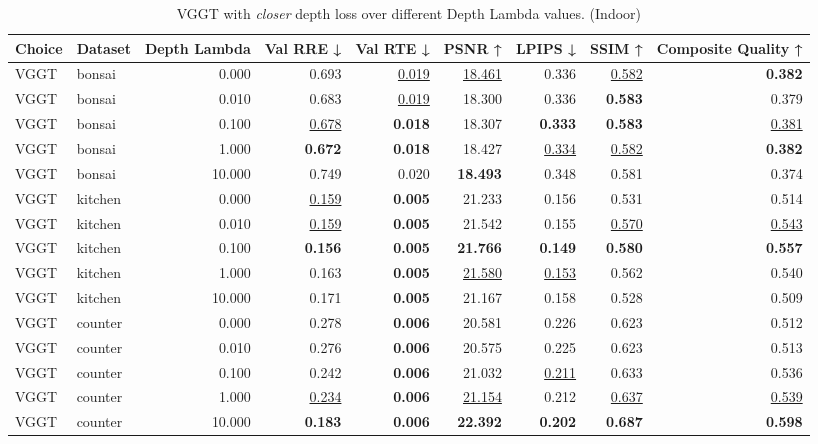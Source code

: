 \begin{table}[H]
\caption{\ifdefined\customcaption \customcaption \else VGGT with \textit{closer} depth loss over different Depth Lambda values. (Indoor) \fi}
\label{tab:05_depth_lambda_indoor}
\centering
\scriptsize
\begin{tabular}{llrrrrrrr}
\toprule
Choice & Dataset & Depth Lambda & Val RRE ↓ & Val RTE ↓ & PSNR ↑ & LPIPS ↓ & SSIM ↑ & Composite Quality ↑ \\
\midrule
VGGT & bonsai & 0.000 & 0.693 & \underline{0.019} & \underline{18.461} & 0.336 & \underline{0.582} & \textbf{0.382} \\
VGGT & bonsai & 0.010 & 0.683 & \underline{0.019} & 18.300 & 0.336 & \textbf{0.583} & 0.379 \\
VGGT & bonsai & 0.100 & \underline{0.678} & \textbf{0.018} & 18.307 & \textbf{0.333} & \textbf{0.583} & \underline{0.381} \\
VGGT & bonsai & 1.000 & \textbf{0.672} & \textbf{0.018} & 18.427 & \underline{0.334} & \underline{0.582} & \textbf{0.382} \\
VGGT & bonsai & 10.000 & 0.749 & 0.020 & \textbf{18.493} & 0.348 & 0.581 & 0.374 \\
\midrule
VGGT & kitchen & 0.000 & \underline{0.159} & \textbf{0.005} & 21.233 & 0.156 & 0.531 & 0.514 \\
VGGT & kitchen & 0.010 & \underline{0.159} & \textbf{0.005} & 21.542 & 0.155 & \underline{0.570} & \underline{0.543} \\
VGGT & kitchen & 0.100 & \textbf{0.156} & \textbf{0.005} & \textbf{21.766} & \textbf{0.149} & \textbf{0.580} & \textbf{0.557} \\
VGGT & kitchen & 1.000 & 0.163 & \textbf{0.005} & \underline{21.580} & \underline{0.153} & 0.562 & 0.540 \\
VGGT & kitchen & 10.000 & 0.171 & \textbf{0.005} & 21.167 & 0.158 & 0.528 & 0.509 \\
\midrule
VGGT & counter & 0.000 & 0.278 & \textbf{0.006} & 20.581 & 0.226 & 0.623 & 0.512 \\
VGGT & counter & 0.010 & 0.276 & \textbf{0.006} & 20.575 & 0.225 & 0.623 & 0.513 \\
VGGT & counter & 0.100 & 0.242 & \textbf{0.006} & 21.032 & \underline{0.211} & 0.633 & 0.536 \\
VGGT & counter & 1.000 & \underline{0.234} & \textbf{0.006} & \underline{21.154} & 0.212 & \underline{0.637} & \underline{0.539} \\
VGGT & counter & 10.000 & \textbf{0.183} & \textbf{0.006} & \textbf{22.392} & \textbf{0.202} & \textbf{0.687} & \textbf{0.598} \\
\bottomrule
\end{tabular}
\end{table}